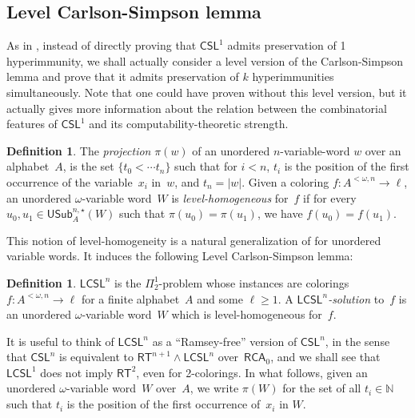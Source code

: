 \documentclass{article}
\newcommand{\RCA}[0]{\mathsf{RCA}}
\newcommand{\RT}[0]{\mathsf{RT}}
\newcommand{\CSL}[0]{\mathsf{CSL}}
\newcommand{\LCSL}[0]{\mathsf{LCSL}}
\newcommand{\NN}[0]{\mathbb{N}}
\newcommand{\USub}{\mathsf{USub}}
\def\qt#1{``#1''}%
\numberwithin{theorem}{section}
\theoremstyle{definition}
\newtheorem{definition}[theorem]{Definition}
\begin{document}
\subsection{Level Carlson-Simpson lemma}

As in , instead of directly proving that $\CSL^1$ admits preservation of 1 hyperimmunity, we shall actually consider a level version of the Carlson-Simpson lemma and prove that it admits preservation of $k$ hyperimmunities simultaneously. Note that one could have proven  without this level version, but it actually gives more information about the relation between the combinatorial features of $\CSL^1$ and its computability-theoretic strength.

\begin{definition}
The \emph{projection} $\pi(w)$ of an unordered $n$-variable-word $w$ over an alphabet~$A$, is the set $\{ t_0 < \cdots t_n \}$ such that for $i < n$, $t_i$ is the position of the first occurrence of the variable~$x_i$ in~$w$, and $t_n = |w|$. Given a coloring $f : A^{<\omega, n} \to \ell$, an unordered $\omega$-variable word~$W$ is \emph{level-homogeneous} for~$f$ if for every $u_0, u_1 \in \USub^{n,\star}_A(W)$ such that $\pi(u_0) = \pi(u_1)$, we have $f(u_0) = f(u_1)$.
\end{definition}

This notion of level-homogeneity is a natural generalization of  for unordered variable words. It induces the following Level Carlson-Simpson lemma:

\begin{definition}
$\LCSL^n$ is the $\Pi^1_2$-problem whose instances are colorings $f : A^{<\omega,n} \to \ell$ for a finite alphabet~$A$ and some $\ell \geq 1$. A \emph{$\LCSL^n$-solution} to~$f$ is an unordered $\omega$-variable word~$W$ which is level-homogeneous for~$f$.
\end{definition}

It is useful to think of $\LCSL^n$ as a \qt{Ramsey-free} version of $\CSL^n$, in the sense that $\CSL^n$ is equivalent to $\RT^{n+1} \wedge \LCSL^n$ over~$\RCA_0$, and we shall see that $\LCSL^1$ does not imply $\RT^2$, even for 2-colorings. In what follows, given an unordered $\omega$-variable word~$W$ over~$A$, we write $\pi(W)$ for the set of all $t_i \in \NN$ such that $t_i$ is the position of the first occurrence of~$x_i$ in $W$.
\end{document}
